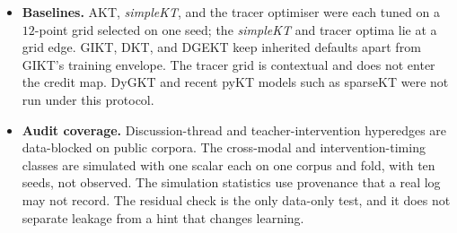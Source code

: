 \documentclass[review,12pt]{elsarticle}
\begin{document}
\begin{itemize}
  learned half-lives, and Hawkes kernels were not.
  \item \textbf{Baselines.} AKT, \textit{simpleKT}, and the tracer
  optimiser were each tuned on a $12$-point grid selected on one seed;
  the \textit{simpleKT} and tracer optima lie at a grid edge. GIKT,
  DKT, and DGEKT keep inherited defaults apart from GIKT's training
  envelope. The tracer grid is contextual and does not enter the credit
  map. DyGKT and recent pyKT models such as sparseKT were not run under
  this protocol.
  \item \textbf{Audit coverage.} Discussion-thread and
  teacher-intervention hyperedges are data-blocked on public corpora.
  The cross-modal and intervention-timing classes are simulated with
  one scalar each on one corpus and fold, with ten seeds, not observed.
  The simulation statistics use provenance that a real log may not
  record. The residual check is the only data-only test, and it does
  not separate leakage from a hint that changes learning.
\end{itemize}

\end{document}
